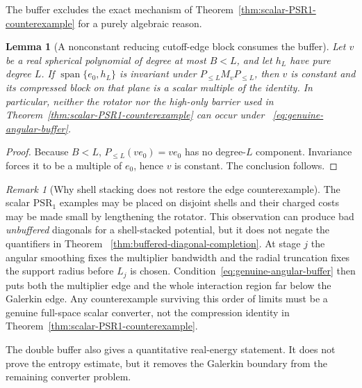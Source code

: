 \documentclass[11pt]{article}
\newtheorem{lemma}[theorem]{Lemma}
\theoremstyle{definition}
\theoremstyle{remark}
\newtheorem{remark}[theorem]{Remark}
\begin{document}
The buffer excludes the exact mechanism of
Theorem~\ref{thm:scalar-PSR1-counterexample} for a purely algebraic reason.

\begin{lemma}[A nonconstant reducing cutoff-edge block consumes the buffer]
\label{lem:buffer-excludes-cutoff-edge-lift}
Let $v$ be a real spherical polynomial of degree at most $B<L$, and let $h_L$
have pure degree $L$.  If $\operatorname{span}\{e_0,h_L\}$ is invariant under
$P_{\leq L}M_vP_{\leq L}$, then $v$ is constant and its compressed block on
that plane is a scalar multiple of the identity.  In particular, neither the
rotator nor the high-only barrier used in
Theorem~\ref{thm:scalar-PSR1-counterexample} can occur under
~\eqref{eq:genuine-angular-buffer}.
\end{lemma}

\begin{proof}
Because $B<L$,
$P_{\leq L}(ve_0)=ve_0$ has no degree-$L$ component.  Invariance forces it to
be a multiple of $e_0$, hence $v$ is constant.  The conclusion follows.
\end{proof}

\begin{remark}[Why shell stacking does not restore the edge counterexample]
The scalar $\mathrm{PSR}_1$ examples may be placed on disjoint shells and their
charged costs may be made small by lengthening the rotator.  This observation
can produce bad \emph{unbuffered} diagonals for a shell-stacked potential, but
it does not negate the quantifiers in Theorem
~\ref{thm:buffered-diagonal-completion}.  At stage $j$ the angular smoothing
fixes the multiplier bandwidth and the radial truncation fixes the support
radius before $L_j$ is chosen.  Condition~\eqref{eq:genuine-angular-buffer}
then puts both the multiplier edge and the whole interaction region far below
the Galerkin edge.  Any counterexample surviving this order of limits must be
a genuine full-space scalar converter, not the compression identity in
Theorem~\ref{thm:scalar-PSR1-counterexample}.
\end{remark}

The double buffer also gives a quantitative real-energy statement.  It does
not prove the entropy estimate, but it removes the Galerkin boundary from the
remaining converter problem.
\end{document}
